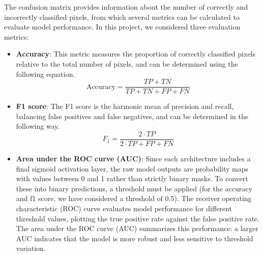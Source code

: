 The confusion matrix provides information about the number of correctly and incorrectly classified pixels, from which several metrics can be calculated to evaluate model performance. In this project, we considered three evaluation metrics:\\
\begin{itemize}
    \item \textbf{Accuracy}: This metric measures the proportion of correctly classified pixels relative to the total number of pixels, and can be determined using the following equation.\\
    \begin{equation}
    \text{Accuracy} = \frac{TP + TN}{TP + TN + FP + FN}
    \end{equation}
    \item \textbf{F1 score}: The F1 score is the harmonic mean of precision and recall, balancing false positives and false negatives, and can be determined in the following way.
    \begin{equation}
        F_{1} = \frac{2 \cdot TP}{2 \cdot TP + FP + FN}
    \end{equation}
    \item \textbf{Area under the ROC curve (AUC)}:  Since each architecture includes a final sigmoid activation layer, the raw model outputs are probability maps with values between 0 and 1 rather than strictly binary masks. To convert these into binary predictions, a threshold must be applied (for the accuracy and f1 score, we have considered a threshold of 0.5). The receiver operating characteristic (ROC) curve evaluates model performance for different threshold values, plotting the true positive rate against the false positive rate. The area under the ROC curve (AUC) summarizes this performance: a larger AUC indicates that the model is more robust and less sensitive to threshold variation. 
\end{itemize}

